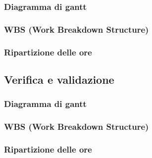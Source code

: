 			\subsubsection{Diagramma di gantt}
			\subsubsection{WBS (Work Breakdown Structure)}
			\subsubsection{Ripartizione delle ore}
			
		\subsection{Verifica e validazione}
			\subsubsection{Diagramma di gantt}
			\subsubsection{WBS (Work Breakdown Structure)}
			\subsubsection{Ripartizione delle ore}
			
		
